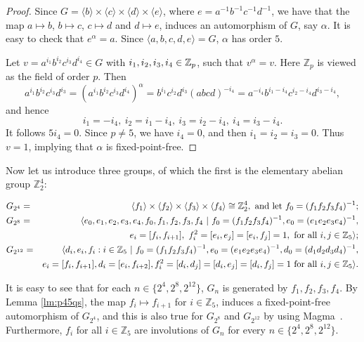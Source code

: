 \documentclass[12pt,reqno]{amsart}
\renewcommand\a{\alpha}  \renewcommand\b{\beta}
\newcommand\mz{\mathbb{Z}}
\numberwithin {equation} {section}
\begin{document}
\begin{proof} Since $G=\langle b\rangle\times\langle c\rangle\times\langle d\rangle\times\langle e\rangle$, where $e=a^{-1}b^{-1}c^{-1}d^{-1}$, we have that the map $a\mapsto b$, $b\mapsto c$, $c\mapsto d$ and $d\mapsto e$, induces an automorphism of $G$, say $\a$. It is easy to check that $e^\a=a$. Since $\langle a,b,c,d,e\rangle=G$, $\a$ has order $5$.

Let $v=a^{i_1}b^{i_2}c^{i_3}d^{i_4} \in G$ with $i_1,i_2,i_3,i_4 \in \mathbb{Z}_p$, such that $v^\a=v$. Here $\mz_p$ is viewed as the field of order $p$. Then
  \[ a^{i_1}b^{i_2}c^{i_3}d^{i_3}=(a^{i_1}b^{i_2}c^{i_3}d^{i_4})^{\a}=b^{i_1}c^{i_2}d^{i_3}(abcd)^{-i_4}=a^{-i_4}b^{i_1-i_4}c^{i_2-i_4}d^{i_3-i_4},\]
 and hence
 \[ i_1=-i_4 ,\ i_2 = i_1-i_4,\ i_3 = i_2-i_4,\ i_4 =i_3-i_4.\] It follows
 $5i_4=0$. Since $p\not=5$, we have $i_4=0$, and then $i_1=i_2=i_3=0$. Thus $v=1$, implying that $\a$ is fixed-point-free.
 \end{proof}

Now let us introduce three groups, of which the first is the elementary abelian group $\mz_2^4$:

 \begin{eqnarray*}
&G_{2^4}=&\langle f_1\rangle\times\langle f_2\rangle\times\langle f_3\rangle\times\langle
f_4\rangle\cong \ZZ_2^4, \mbox{ and let } f_0=(f_1f_2f_3f_4)^{-1};  \\
&G_{2^8}=&\langle e_0, e_1,e_2,e_3,e_4,f_0,f_1,f_2,f_3,f_4\ \lvert\
  f_0=(f_1f_2f_3f_4)^{-1}, e_0=(e_1e_2e_3e_4)^{-1}, \\
 && e_i=[f_i,f_{i+1}],\ f_i^2=[e_i,e_j]=[e_i,f_j]=1, \mbox{ for all } i,j \in \ZZ_5 \rangle;\\
 &G_{2^{12}}=&\langle d_i,e_i,f_i: i \in  \ZZ_5 \ \lvert\   f_0=(f_1f_2f_3f_4)^{-1}, e_0=(e_1e_2e_3e_4)^{-1},  d_0=(d_1d_2d_3d_4)^{-1},\\
 & & e_i=[f_i,f_{i+1}], d_i=[e_i,f_{i+2}], f_i^2=[d_i,d_j]=[d_i,e_j]=[d_i,f_j]=1 \text{ \rm for all } i,j \in \ZZ_5 \rangle.
 \end{eqnarray*}

It is easy to see that for each $n\in \{2^4,2^8,2^{12}\}$, $G_n$ is generated by $f_1,f_2,f_3,f_4$.  By Lemma \ref{lm:p45qs}, the map $f_i\mapsto f_{i+1}$ for $i\in\mz_5$, induces a fixed-point-free automorphism of $G_{2^4}$, and this is also true for  $G_{2^8}$ and $G_{2^{12}}$ by using {\sc Magma}~\cite{Magma}. Furthermore, $f_i$ for all $i\in\mz_5$ are involutions of $G_n$ for every $n\in \{2^4,2^8,2^{12}\}$.
\end{document}
